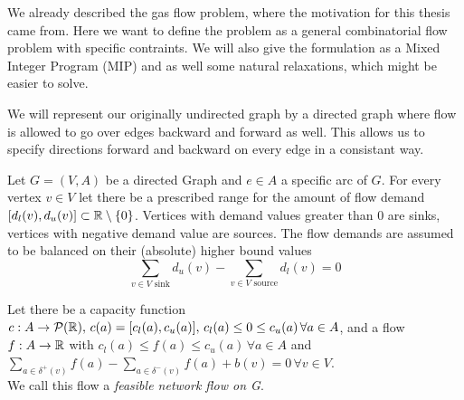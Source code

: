 We already described the gas flow problem, where the motivation for this thesis came from. Here we want to define the 
problem as a general combinatorial flow problem with specific contraints. We will also give the formulation as a Mixed 
Integer Program (MIP) and as well some natural relaxations, which might be easier to solve.

We will represent our originally undirected graph by a directed graph where flow is allowed to go over edges backward 
and forward as well. This allows us to specify directions forward and backward on every edge in a consistant way. 


\begin{definition}
 Let $G=(V,A)$ be a directed Graph and $e \in A$ a specific arc of $G$. For every vertex $v\in V$ let there be a 
prescribed range for the amount of flow demand $[d_l(v), d_u(v)]\subset \mathbb{R} \setminus \{0\}$. Vertices with demand 
values greater than 0 are sinks, vertices with negative demand value are sources. The flow demands are assumed to be 
balanced on their (absolute) higher bound values 
$$\sum_{v \in V\textrm{ sink}}d_u(v)-\sum_{v \in V\textrm{ source}}d_l(v)=0$$ 

Let there be a capacity function $c:A\to \mathcal{P}(\mathbb{R}), \, c(a)=[c_l(a), c_u(a)],\, c_l(a)\le 0 \le c_u(a) \, \forall 
a\in A$, and a flow  $f: A\to \mathbb{R} $ with $c_l(a)\le f(a)\le 
c_u(a)\, \forall a\in A$ and $\sum_{a\in \delta^+(v)}f(a)-\sum_{a\in\delta^-(v)}f(a)+b(v) = 0 \, \forall v\in V$.\\
We call this flow a \textit{feasible network flow on G}.
\end{definition}

